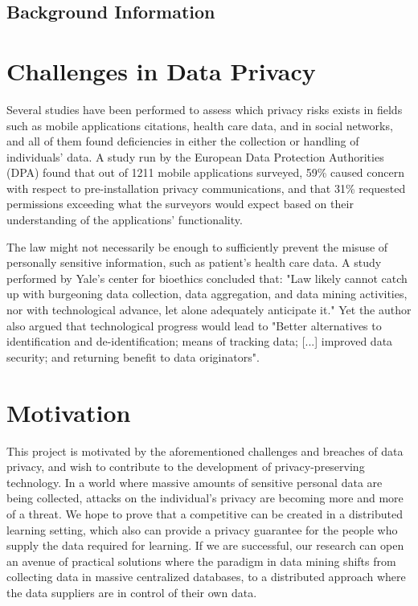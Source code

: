\subsection{Background Information}	


\section{Challenges in Data Privacy}

Several studies have been performed to assess which privacy risks exists in fields such as mobile applications {citations}, health care data, and in social networks, and all of them found deficiencies in either the collection or handling of individuals' data. A study run by the European Data Protection Authorities (DPA) found that out of 1211 mobile applications surveyed, 59\% caused concern with respect to pre-installation privacy communications, and that 31\%  requested permissions exceeding what the surveyors would expect based on their understanding of the applications’ functionality\cite{EUprivacySweep2014}. 

The law might not necessarily be enough to sufficiently prevent the misuse of personally sensitive information, such as patient's health care data. A study performed by Yale's center for bioethics concluded that: "Law likely cannot catch up with burgeoning data collection, data aggregation, and data
mining activities, nor with technological advance, let alone adequately anticipate it." Yet the author also argued that technological progress would lead to "Better alternatives to identification and de-identification;  means of tracking data; [...] improved data security; and returning benefit to data originators"\cite{kaplan2014patient}.

\section{Motivation}
This project is motivated by the aforementioned challenges and breaches of data privacy, and wish to contribute to the development of privacy-preserving technology. In a world where massive amounts of sensitive personal data are being collected, attacks on the individual's privacy are becoming more and more of a threat. We hope to prove that a competitive can be created in a distributed learning setting, which also can provide a privacy guarantee for the people who supply the data required for learning. If we are successful, our research can open an avenue of practical solutions where the paradigm in data mining shifts from collecting data in massive centralized databases, to a distributed approach where the data suppliers are in control of their own data.  


\cleardoublepage